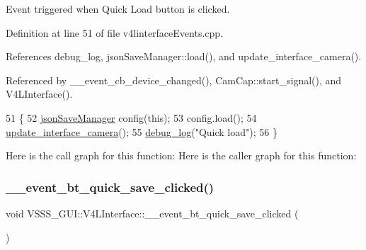 Event triggered when \textquotesingle{}Quick Load\textquotesingle{} button is clicked. 



Definition at line 51 of file v4linterface\+Events.\+cpp.



References debug\+\_\+log, json\+Save\+Manager\+::load(), and update\+\_\+interface\+\_\+camera().



Referenced by \+\_\+\+\_\+event\+\_\+cb\+\_\+device\+\_\+changed(), Cam\+Cap\+::start\+\_\+signal(), and V4\+L\+Interface().


\begin{DoxyCode}
51                                                      \{
52         \hyperlink{classjson_save_manager}{jsonSaveManager} config(\textcolor{keyword}{this});
53         config.load();
54         \hyperlink{class_v_s_s_s___g_u_i_1_1_v4_l_interface_a13ef172ecb7af3eb140f686b02a80662}{update\_interface\_camera}();
55         \hyperlink{debug_8hpp_afde3f42696113719c9ae35507125ee6e}{debug\_log}(\textcolor{stringliteral}{"Quick load"});
56     \}
\end{DoxyCode}
Here is the call graph for this function\+:
Here is the caller graph for this function\+:
\mbox{\label{class_v_s_s_s___g_u_i_1_1_v4_l_interface_a018c35ae221964d08f1abb40ba01abcf}} 
\subsubsection{\texorpdfstring{\+\_\+\+\_\+event\+\_\+bt\+\_\+quick\+\_\+save\+\_\+clicked()}{\_\_event\_bt\_quick\_save\_clicked()}}
{\footnotesize\ttfamily void V\+S\+S\+S\+\_\+\+G\+U\+I\+::\+V4\+L\+Interface\+::\+\_\+\+\_\+event\+\_\+bt\+\_\+quick\+\_\+save\+\_\+clicked (\begin{DoxyParamCaption}{ }\end{DoxyParamCaption})}



